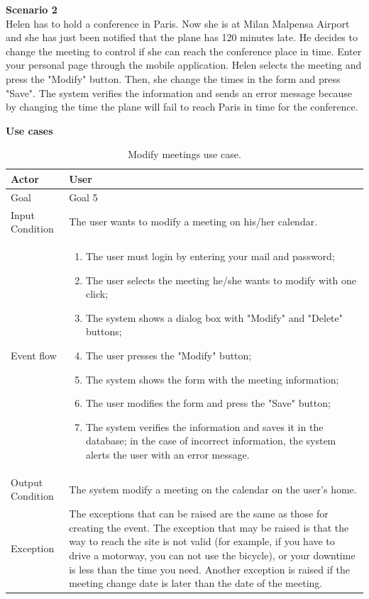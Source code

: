 \documentclass{article}
\begin{document}
	\bigskip
	\noindent
	\textbf{Scenario 2} \\
	Helen has to hold a conference in Paris. Now she is at Milan Malpensa Airport and she has just been notified that the plane has 120 minutes late. He decides to change the meeting to control if she can reach the conference place in time. Enter your personal page through the mobile application. Helen selects the meeting and press the "Modify" button. Then, she change the times in the form and press "Save". The system verifies the information and sends an error message because by changing the time the plane will fail to reach Paris in time for the conference.
	
	\bigskip
	\noindent
	\textbf{Use cases} \\
	
	\begin{table}[htp]
	\caption{Modify meetings use case.}
		\begin{center}
    			\begin{tabular}{p{}|p{}}
   			 	\hline
    				Actor & User \\ \hline
    				Goal &  Goal 5 \\ \hline
    				Input Condition & The user wants to modify a meeting on his/her calendar. \\ \hline
    				Event flow & 
				\begin{enumerate}
  					\item The user must login by entering your mail and password;
  					\item The user selects the meeting he/she wants to modify with one click;
  					\item The system shows a dialog box with "Modify" and "Delete" buttons;
  					\item The user presses the "Modify" button;
  					\item The system shows the form with the meeting information;
  					\item The user modifies the form and press the "Save" button;
  					\item The system verifies the information and saves it in the database; in the case of incorrect information, the system alerts the user with an error message.
 				 \end{enumerate} \\ \hline
    				Output Condition & The system modify a meeting on the calendar on the user's home. \\ \hline
    				Exception & The exceptions that can be raised are the same as those for creating the event. The exception that may be raised is that the way to reach the site is not valid (for example, if you have to drive a motorway, you can not use the bicycle), or your downtime is less than the time you need. Another exception is raised if the meeting change date is later than the date of the meeting. \\ \hline
    			\end{tabular}
		\end{center}
	\end{table}
	
\end{document}

